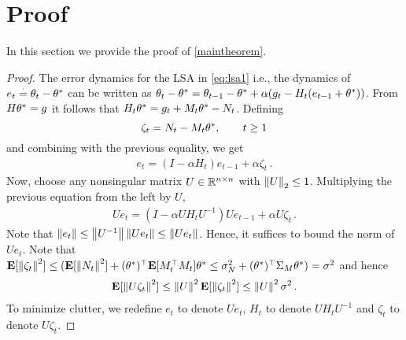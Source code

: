 \section{Proof}
\label{sec:proof}
In this section we provide the proof of \cref{maintheorem}.
\begin{proof}
The error dynamics for the LSA in \eqref{eq:lsa1} i.e., the dynamics of $e_t\stackrel{\cdot}{=}\theta_t-\theta^*$ can be written as
$\theta_t-\theta^*=\theta_{t-1}-\theta^*+\alpha(g_t -H_t(e_{t-1}+\theta^*))$.
From $H\theta^*=g$ it follows that $H_t\theta^* = g_t + M_t\theta^* - N_t$. Defining
\[
\zeta_t = N_t - M_t \theta^*, \qquad t\ge 1
\]
and combining with the previous equality, we get
\begin{align}\label{lsergen}
e_t=(I-\alpha H_t)e_{t-1}+\alpha \zeta_t\,.
\end{align}
Now, choose any nonsingular matrix $U\in \mathbb{R}^{n\times n}$ with $\left\| U\right\|_2 \le 1$.
Multiplying the previous equation from the left by $U$,
\begin{align}
U e_t=(I-\alpha U H_t U^{-1}) Ue_{t-1}+\alpha U \zeta_t\,.
\label{eq:lsergen2}
\end{align}
Note that $\left\| e_t\right\|\le \left\| U^{-1}\right\| \left\| U e_t\right\| \le \left\|  U e_t\right\|$.
Hence, it suffices to bound the norm of $U e_t$. 
Note that
$
\mathbf{E}[ \left\| \zeta_t\right\|^2 ]
\le (\mathbf{E}[ \left\| N_t\right\|^2 ] + (\theta^*)^\top \mathbf{E}[ M_t^\top M_t ]\theta^* \le \sigma_N^2 + (\theta^*)^\top \Sigma_M \theta^*)
= \sigma^2
$
and hence
\begin{align*}
\mathbf{E}[ \left\|  U \zeta_t\right\|^2 ] \le \left\| U\right\|^2 \mathbf{E}[ \left\| \zeta_t\right\|^2 ] \le \left\| U\right\|^2 \sigma^2\,.
\end{align*}
To minimize clutter, we redefine $e_t$ to denote $U e_t$, $H_t$ to denote $U H_t U^{-1}$ and $\zeta_t$ to denote $U \zeta_t$.


\end{proof}
